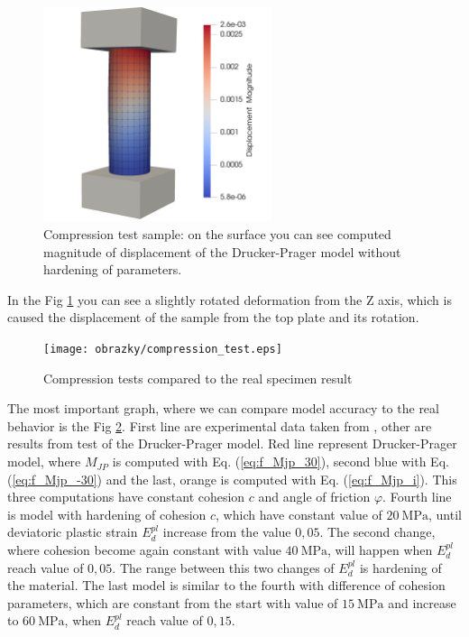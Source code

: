 \begin{figure}[h!]
	\centering
	\includegraphics[width=0.6\textwidth]{obrazky/Compresion_test_3d.png}
	\caption[Compression test sample]{Compression test sample: on the surface you can see computed magnitude of displacement of the Drucker-Prager model without hardening of parameters.}\label{obr:Compresion_test}
\end{figure}

In the Fig \ref{obr:Compresion_test} you can see a slightly rotated deformation from the Z axis, which is caused the displacement of the sample from the top plate and its rotation. 

\begin{figure}[h!]
	\centering
	\texttt{[image: obrazky/compression\_test.eps]}
	\caption[Compresion tests]{Compression tests compared to the real specimen result \cite{Deuch_phd_thesis}}\label{obr:Compresion_2d}
\end{figure}


The most important graph, where we can compare model accuracy to the real behavior is the Fig \ref{obr:Compresion_2d}. First line are experimental data taken from \cite{Deuch_phd_thesis}, other are results from test of the Drucker-Prager model. Red line represent Drucker-Prager model, where $M_{JP}$ is computed with Eq. (\ref{eq:f_Mjp_30}), second blue with Eq. (\ref{eq:f_Mjp_-30}) and the last, orange is computed with Eq. (\ref{eq:f_Mjp_i}). This three computations have constant cohesion $c$ and angle of friction $\varphi$. Fourth line is model with hardening of cohesion $c$, which have constant value of $20~\mathrm{MPa}$, until deviatoric plastic strain $E_d^{pl}$ increase from the value $0,05$. The second change, where cohesion become again constant with value $40~\mathrm{MPa}$, will happen when $E_d^{pl}$ reach value of $0,05$. The range between this two changes of $E_d^{pl}$ is hardening of the material. The last model is similar to the fourth with difference of cohesion parameters, which are constant from the start with value of $15~\mathrm{MPa}$ and increase to $60~\mathrm{MPa}$, when $E_d^{pl}$ reach value of $0,15$. 

